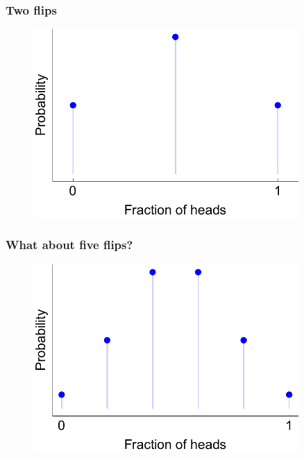 \documentclass{beamer}
\begin{document}
	\begin{frame}
		\frametitle{Two flips}
		
		\begin{figure}[ht]
			\centerline{\includegraphics[width=0.9\textwidth]{./figures/binomial_2.pdf}}
		\end{figure}
		
	\end{frame}
	
	\begin{frame}
		\frametitle{What about five flips?}
		
		\begin{figure}[ht]
			\centerline{\includegraphics[width=0.9\textwidth]{./figures/binomial_5.pdf}}
		\end{figure}
		
	\end{frame}
	
\end{document}
